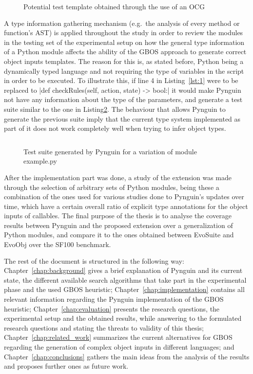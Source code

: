\documentclass[%
  chapterprefix=false,%
  open=right,%
  twoside=true,%
  paper=a4,%
  logofile={Figures/logo.png},%
  thesistype=master,%
  UKenglish,%
]{se2thesis}
\begin{document}
\begin{figure}
  \inputminted[linenos]{python}{Figures/template.py}
  \caption{Potential test template obtained through the use of an OCG\label{lst:4}}
\end{figure}

A type information gathering mechanism (e.g.~the analysis of every method or function's AST) is applied throughout the study in order to review the modules in the testing set of the experimental setup on how the general type information of a Python module affects the ability of the GBOS approach to generate correct object inputs templates.
The reason for this is, as stated before, Python being a dynamically typed language and not requiring the type of variables in the script in order to be executed.
To illustrate this, if line 4 in Listing~\ref{lst:1} were to be replaced to |def checkRules(self, action, state) -> bool:| it would make Pynguin not have any information about the type of the parameters, and generate a test suite similar to the one in Listing\ref{lst:5}.
The behaviour that allows Pynguin to generate the previous suite imply that the current type system implemented as part of it does not work completely well when trying to infer object types.

\begin{figure}
  \inputminted[linenos]{python}{Figures/test2.py}
  \caption{Test suite generated by Pynguin for a variation of module example.py\label{lst:5}}
\end{figure}

After the implementation part was done, a study of the extension was made through the selection of arbitrary sets of Python modules, being these a combination of the ones used for various studies done to Pynguin's updates over time, which have a certain overall ratio of explicit type annotations for the object inputs of callables.
The final purpose of the thesis is to analyse the coverage results between Pynguin and the proposed extension over a generalization of Python modules, and compare it to the ones obtained between EvoSuite and EvoObj over the SF100 benchmark.

The rest of the document is structured in the following way: Chapter~\ref{chap:background} gives a brief explanation of Pynguin and its current state, the different available search algorithms that take part in the experimental phase and the used GBOS heuristic; Chapter~\ref{chap:implementation} contains all relevant information regarding the Pynguin implementation of the GBOS heuristic; Chapter~\ref{chap:evaluation} presents the research questions, the experimental setup and the obtained results, while answering to the formulated research questions and stating the threats to validity of this thesis; Chapter~\ref{chap:related_work} summarizes the current alternatives for GBOS regarding the generation of complex object inputs in different languages; and Chapter~\ref{chap:conclusions} gathers the main ideas from the analysis of the results and proposes further ones as future work.
\end{document}
